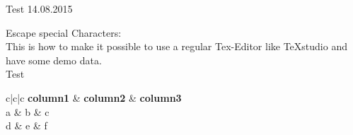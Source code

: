 \documentclass[
a4paper,                                               %
landscape,
oneside,                                               %
12pt,                                                  %
pagesize=auto,                                         %
headsepline,                                           %
]{scrreprt}
\newcommand{\cs}[2]{#2}
\begin{document}
\textbf{}\hfill{\Huge Test} \hfill \cs{\verb|## print DateTime.Now.ToShortDateString(); ##|}{14.08.2015}

Escape special Characters:\\

This is how to make it possible to use a regular Tex-Editor like TeXstudio and have some demo data.\\
\cs{{## print 1; ##}}{Test}

    \begin{bchart}[step=2,max=10]
				\smallskip
				\medskip
				\bigskip
    \end{bchart}


\begin{center}
\small
\begin{longtable}{\cs{\verb$## print EnumerableExtension.Implode(Enumerable.Repeat("c", columns), "|"); ##$}{c|c|c}}
	\cs{
	\begin{comment}##
	foreach (var h in o.Headers) {
		print (first ? "" : @" & ") + @"\textbf{" + Tex.Escape(h) + @"}";
		first = false;
	}
	##\end{comment}
	}{\textbf{column1} & \textbf{column2} & \textbf{column3}}\\
	\hline
	\endhead
	\cs{
	\begin{comment}##
	foreach (var e in o.Entries) {
		first = true;
		foreach (var v in e) {
			print (first ? "" : @" & ") + Tex.Escape(v);
			first = false;
		}
		print @"\\\hline
	";
	}
	##\end{comment}
	}{a & b & c\\\hline
	d & e & f\\\hline}
\end{longtable}
\end{center}
\end{document}
